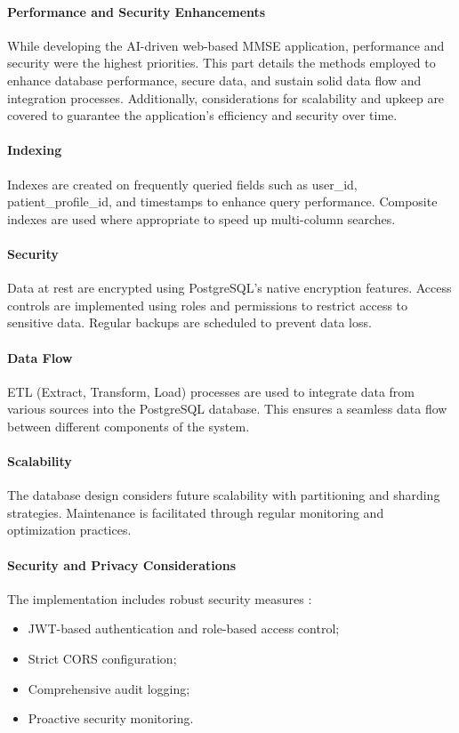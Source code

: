 \paragraph{Performance and Security Enhancements}
While developing the AI-driven web-based MMSE application, performance and security were the highest priorities. This part details the methods employed to enhance database performance, secure data, and sustain solid data flow and integration processes. Additionally, considerations for scalability and upkeep are covered to guarantee the application's efficiency and security over time.

\paragraph{Indexing}
Indexes are created on frequently queried fields such as user\_id, patient\_profile\_id, and timestamps to enhance query performance. Composite indexes are used where appropriate to speed up multi-column searches.

\paragraph{Security}
Data at rest are encrypted using PostgreSQL's native encryption features. Access controls are implemented using roles and permissions to restrict access to sensitive data. Regular backups are scheduled to prevent data loss.

\paragraph{Data Flow}
ETL (Extract, Transform, Load) processes are used to integrate data from various sources into the PostgreSQL database. This ensures a seamless data flow between different components of the system.

\paragraph{Scalability}
The database design considers future scalability with partitioning and sharding strategies. Maintenance is facilitated through regular monitoring and optimization practices.

\paragraph{Security and Privacy Considerations}
The implementation includes robust security measures \cite{owasp2021top10}:
\begin{itemize}
    \item JWT-based authentication and role-based access control;
    \item Strict CORS configuration;
    \item Comprehensive audit logging;
    \item Proactive security monitoring.
\end{itemize}

